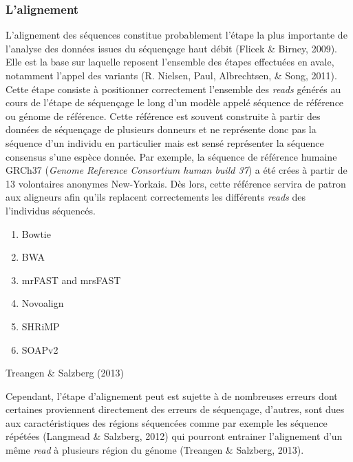 \documentclass[12pt,twoside]{reedthesis}
\providecommand{\tightlist}{%
  \setlength{\itemsep}{0pt}\setlength{\parskip}{0pt}}
\theoremstyle{definition}
\theoremstyle{definition}
\theoremstyle{remark}
\begin{document}
  \subsubsection{L'alignement}\label{lalignement}
  
  L'alignement des séquences constitue probablement l'étape la plus
  importante de l'analyse des données issues du séquençage haut débit
  (Flicek \& Birney, 2009). Elle est la base sur laquelle reposent
  l'ensemble des étapes effectuées en avale, notamment l'appel des
  variants (R. Nielsen, Paul, Albrechtsen, \& Song, 2011). Cette étape
  consiste à positionner correctement l'ensemble des \emph{reads} générés
  au cours de l'étape de séquençage le long d'un modèle appelé séquence de
  référence ou génome de référence. Cette référence est souvent construite
  à partir des données de séquençage de plusieurs donneurs et ne
  représente donc pas la séquence d'un individu en particulier mais est
  sensé représenter la séquence consensus s'une espèce donnée. Par
  exemple, la séquence de référence humaine GRCh37 (\emph{Genome Reference
  Consortium human build 37}) a été crées à partir de 13 volontaires
  anonymes New-Yorkais. Dès lors, cette référence servira de patron aux
  aligneurs afin qu'ils replacent correctements les différents
  \emph{reads} des l'individus séquencés.
  
  \begin{enumerate}
  \def\labelenumi{\arabic{enumi}.}
  \tightlist
  \item
    Bowtie
  \item
    BWA
  \item
    mrFAST and mrsFAST\\
  \item
    Novoalign\\
  \item
    SHRiMP\\
  \item
    SOAPv2
  \end{enumerate}
  
  Treangen \& Salzberg (2013)
  
  Cependant, l'étape d'alignement peut est sujette à de nombreuses erreurs
  dont certaines proviennent directement des erreurs de séquençage,
  d'autres, sont dues aux caractéristiques des régions séquencées comme
  par exemple les séquence répétées (Langmead \& Salzberg, 2012) qui
  pourront entrainer l'alignement d'un même \emph{read} à plusieurs région
  du génome (Treangen \& Salzberg, 2013).
  
\end{document}
